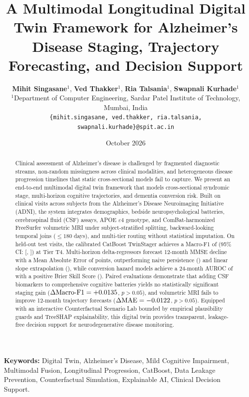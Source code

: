 \documentclass[11pt,a4paper]{article}
\title{\textbf{A Multimodal Longitudinal Digital Twin Framework for Alzheimer's Disease Staging, Trajectory Forecasting, and Decision Support}}
\author{
  \textbf{Mihit Singasane}$^{1}$, \textbf{Ved Thakker}$^{1}$, \textbf{Ria Talsania}$^{1}$, \textbf{Swapnali Kurhade}$^{1}$ \\[0.5em]
  $^{1}$Department of Computer Engineering, Sardar Patel Institute of Technology, Mumbai, India \\
  \texttt{\{mihit.singasane, ved.thakker, ria.talsania, swapnali.kurhade\}@spit.ac.in}
}
\date{October 2026}
\begin{document}
\maketitle

\begin{abstract}
Clinical assessment of Alzheimer's disease is challenged by fragmented diagnostic streams, non-random missingness across clinical modalities, and heterogeneous disease progression timelines that static cross-sectional models fail to capture. We present an end-to-end multimodal digital twin framework that models cross-sectional syndromic stage, multi-horizon cognitive trajectories, and dementia conversion risk. Built on \TotalRows{} clinical visits across \TotalSubjects{} subjects from the Alzheimer's Disease Neuroimaging Initiative (ADNI), the system integrates demographics, bedside neuropsychological batteries, cerebrospinal fluid (CSF) assays, APOE $\varepsilon4$ genotype, and ComBat-harmonized FreeSurfer volumetric MRI under subject-stratified splitting, backward-looking temporal joins ($\le 180$ days), and multi-tier routing without statistical imputation. On held-out test visits, the calibrated CatBoost TwinStager achieves a Macro-F1 of \StagerTFourFOne{} (95\% CI: [\StagerTFourFCILo{}, \StagerTFourFCIHi{}]) at Tier T4. Multi-horizon delta-regressors forecast 12-month MMSE decline with a Mean Absolute Error of \MMSEMAEXII{} points, outperforming naive persistence (\MMSEPersistXII{}) and linear slope extrapolation (\MMSESlopeXII{}), while conversion hazard models achieve a 24-month AUROC of \ConvAUCXXIV{} with a positive Brier Skill Score (\ConvBSSXXIV{}). Paired evaluations demonstrate that adding CSF biomarkers to comprehensive cognitive batteries yields no statistically significant staging gain ($\Delta\text{Macro-F1} = +0.0135{}$, $p>0.05$), and volumetric MRI fails to improve 12-month trajectory forecasts ($\Delta\text{MAE} = -0.0122{}$, $p>0.05$). Equipped with an interactive Counterfactual Scenario Lab bounded by empirical plausibility guards and TreeSHAP explainability, this digital twin provides transparent, leakage-free decision support for neurodegenerative disease monitoring.
\end{abstract}

\vspace{0.5em}
\noindent\textbf{Keywords:} Digital Twin, Alzheimer's Disease, Mild Cognitive Impairment, Multimodal Fusion, Longitudinal Progression, CatBoost, Data Leakage Prevention, Counterfactual Simulation, Explainable AI, Clinical Decision Support.
\end{document}
